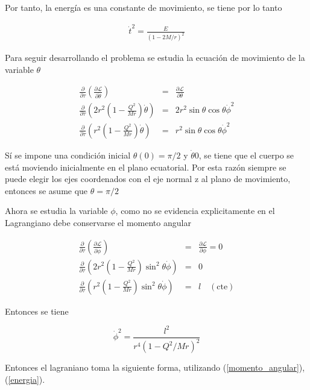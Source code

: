 \documentclass[DIN, pagenumber=false, fontsize=11pt, parskip=half]{scrartcl}
\begin{document}
Por tanto, la energía es una constante de movimiento, se tiene por lo tanto 

\begin{eqnarray}
\label{energia}
    \dot{t}^{2} = \frac{E}{(1-2M/r)^{2}}
\end{eqnarray}
    
Para seguir desarrollando el problema se estudia la ecuación de movimiento de la variable $\theta$

\begin{eqnarray*}
    \frac{\partial}{\partial \tau}\left(\frac{\partial\mathcal{L}}{\partial \dot{\theta}} \right) &=& \frac{\partial\mathcal{L}}{\partial \theta}  \\
    \frac{\partial }{\partial \tau}\left(2r^{2}\left(1-\frac{Q^{2}}{Mr}\right)\dot{\theta}\right) &=& 2r^{2}\sin\theta\cos\theta\dot{\phi}^{2}\\
    \frac{\partial }{\partial \tau}\left(r^{2}\left(1-\frac{Q^{2}}{Mr}\right)\dot{\theta}\right) &=& r^{2}\sin\theta\cos\theta\dot{\phi}^{2}
\end{eqnarray*}

Sí se impone una condición inicial $\theta(0) = \pi/2$ y $\dot{\theta} 0$, se tiene que el cuerpo se está moviendo inicialmente en el plano ecuatorial. Por esta razón siempre se puede elegir los ejes coordenados con el eje normal z al plano de movimiento, entonces se asume que $\theta = \pi/2$

Ahora se estudia la variable $\phi$, como no se evidencia explicitamente en el Lagrangiano debe conservarse el momento angular 

\begin{eqnarray*}
    \frac{\partial}{\partial \tau}\left(\frac{\partial\mathcal{L}}{\partial \dot{\phi}} \right) &=& \frac{\partial\mathcal{L}}{\partial \phi} = 0   \\
    \frac{\partial }{\partial \tau}\left(2r^{2}\left(1-\frac{Q^{2}}{Mr}\right)\sin^{2}\theta\dot{\phi}\right) &=& 0 \\
    \frac{\partial }{\partial \tau}\left(r^{2}\left(1-\frac{Q^{2}}{Mr}\right)\sin^{2}\theta\dot{\phi}\right) &=& l \quad (\text{cte})
\end{eqnarray*}

Entonces se tiene

\begin{equation}
\label{momento_angular}
    \dot{\phi}^{2} = \frac{l^{2}}{r^{4}(1-Q^{2}/Mr)^{2}}
\end{equation}

Entonces el lagraniano toma la siguiente forma, utilizando (\ref{momento_angular}), (\ref{energia}).
\end{document}

